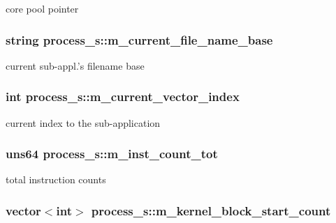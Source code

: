 \label{structprocess__s_a12b9ed9259a013ff8126089193c93dc2}
core pool pointer \hypertarget{structprocess__s_a5bc754a24b94de3a4b1613290905d249}{
\subsubsection[{m\_\-current\_\-file\_\-name\_\-base}]{\setlength{\rightskip}{0pt plus 5cm}string {\bf process\_\-s::m\_\-current\_\-file\_\-name\_\-base}}}
\label{structprocess__s_a5bc754a24b94de3a4b1613290905d249}
current sub-\/appl.'s filename base \hypertarget{structprocess__s_ab3a31ad6a2b66f08214d9df8c1572f4b}{
\subsubsection[{m\_\-current\_\-vector\_\-index}]{\setlength{\rightskip}{0pt plus 5cm}int {\bf process\_\-s::m\_\-current\_\-vector\_\-index}}}
\label{structprocess__s_ab3a31ad6a2b66f08214d9df8c1572f4b}
current index to the sub-\/application \hypertarget{structprocess__s_a5af0d84f34d9a81519faaf6475bb2bff}{
\subsubsection[{m\_\-inst\_\-count\_\-tot}]{\setlength{\rightskip}{0pt plus 5cm}uns64 {\bf process\_\-s::m\_\-inst\_\-count\_\-tot}}}
\label{structprocess__s_a5af0d84f34d9a81519faaf6475bb2bff}
total instruction counts \hypertarget{structprocess__s_ae9086b0940b39f7769ee8c2e9b8dadf9}{
\subsubsection[{m\_\-kernel\_\-block\_\-start\_\-count}]{\setlength{\rightskip}{0pt plus 5cm}vector$<$int$>$ {\bf process\_\-s::m\_\-kernel\_\-block\_\-start\_\-count}}}
